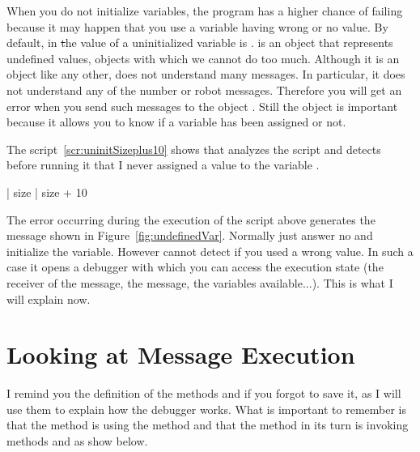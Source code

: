 When you do not initialize variables, the program has a higher chance of failing because it may happen that you use a variable having wrong or no value.  By default, in \st the value of a uninitialized variable is \nil. \nil is an object that represents undefined values, \ie objects with which we cannot do too much.  Although it is an object like any other, \nil does not understand many messages. In particular, it does not understand any of the number or robot messages. Therefore you will get an error when you send such messages to the object \nil. Still the object \nil is important because it allows you to know if a variable has been assigned or not. 



The script~\ref{scr:uninitSizeplus10} shows that \sq analyzes the script and detects before running it that I never assigned a value to the variable .

\begin{scriptwithouttitle}\label{scr:uninitSizeplus10}
| size |
size + 10
\end{scriptwithouttitle}

The error occurring during the execution of the script above
generates the message shown in Figure~\ref{fig:undefinedVar}. Normally just answer no and initialize the variable. However \sq cannot detect if you used a wrong value. In such a case it opens a debugger with which you can access the execution state (the receiver of the message, the message, the variables available...). This is what I will explain now.


\section{Looking at Message Execution}

I remind you the definition of the methods  and  if you forgot to save it, as I will use them to explain how the debugger works. What is important to remember is that the method  is using the method  and that the method  in its turn is invoking methods  and  as show below. 

